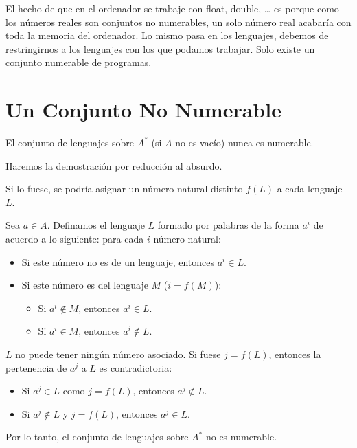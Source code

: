 \documentclass[12pt]{report} %
\begin{document}
El hecho de que en el ordenador se trabaje con float, double, \ldots{}
es porque como los números reales son conjuntos no numerables, un solo
número real acabaría con toda la memoria del ordenador. Lo mismo pasa en
los lenguajes, debemos de restringirnos a los lenguajes con los que
podamos trabajar. Solo existe un conjunto numerable de programas.

\hypertarget{un-conjunto-no-numerable}{%
\section{Un Conjunto No Numerable}\label{un-conjunto-no-numerable}}

\begin{ejemplo}
El conjunto de lenguajes sobre $A^*$ (si $A$ no es vacío) nunca es numerable.  
\end{ejemplo}

Haremos la demostración por reducción al absurdo.\\

\begin{demostracion}
Si lo fuese, se podría asignar un número natural distinto $f(L)$ a cada lenguaje $L$.  

Sea $a \in A$.  
Definamos el lenguaje $L$ formado por palabras de la forma $a^i$ de acuerdo a lo siguiente: para cada $i$ número natural:  
\begin{itemize}
    \item Si este número no es de un lenguaje, entonces $a^i \in L$.  
    \item Si este número es del lenguaje $M$ ($i = f(M)$):  
        \begin{itemize}
            \item Si $a^i \notin M$, entonces $a^i \in L$.  
            \item Si $a^i \in M$, entonces $a^i \notin L$.  
        \end{itemize}
\end{itemize}

$L$ no puede tener ningún número asociado. Si fuese $j = f(L)$, entonces la pertenencia de $a^j$ a $L$ es contradictoria:  
\begin{itemize}
    \item Si $a^j \in L$ como $j = f(L)$, entonces $a^j \notin L$.  
    \item Si $a^j \notin L$ y $j = f(L)$, entonces $a^j \in L$.  
\end{itemize}

Por lo tanto, el conjunto de lenguajes sobre $A^*$ no es numerable.  
\end{demostracion}
\end{document}
